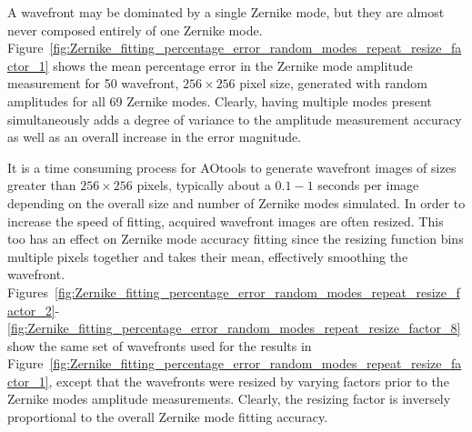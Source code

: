 A wavefront may be dominated by a single Zernike mode, but they are almost 
never composed entirely of one Zernike mode. 
Figure~\ref{fig:Zernike_fitting_percentage_error_random_modes_repeat_resize_factor_1} shows the mean percentage error in the Zernike mode amplitude 
measurement for 50 wavefront, $256\times256$ pixel size, generated with 
random amplitudes for all 69 Zernike modes. Clearly, having multiple modes 
present simultaneously adds a degree of variance to the amplitude 
measurement accuracy as well as an overall increase in the error magnitude.

It is a time consuming process for AOtools to generate wavefront images of 
sizes greater than $256\times256$ pixels, typically about a $0.1-1$ seconds 
per image depending on the overall size and number of Zernike modes 
simulated. In order to increase the speed of fitting, acquired wavefront 
images are often resized. This too has an effect on Zernike mode accuracy 
fitting since the resizing function bins multiple pixels together and takes 
their mean, effectively smoothing the wavefront. 
Figures~\ref{fig:Zernike_fitting_percentage_error_random_modes_repeat_resize_factor_2}-\ref{fig:Zernike_fitting_percentage_error_random_modes_repeat_resize_factor_8} show the same set of wavefronts used for the results in 
Figure~\ref{fig:Zernike_fitting_percentage_error_random_modes_repeat_resize_factor_1}, except that the wavefronts were resized by varying factors prior to the Zernike modes amplitude measurements. Clearly, the resizing factor is inversely proportional to the overall Zernike mode fitting accuracy.

